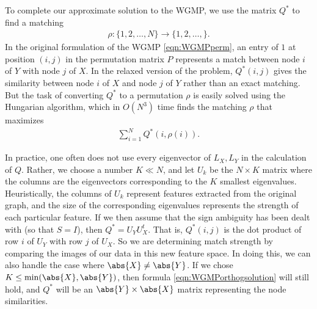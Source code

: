 \documentclass{article}[11pt]
\begin{document}
To complete our approximate solution to the WGMP, we use the matrix $Q^*$ to
find a matching
\begin{align}
  \rho: \{1,2,\ldots,N\} \to \{1,2,\ldots,\}.
\end{align}
In the original formulation of the WGMP \ref{eqn:WGMPperm}, an entry of $1$ at
position $(i,j)$ in the permutation matrix $P$ represents a match between node
$i$ of $Y$ with node $j$ of $X$. In the relaxed version of the problem,
$Q^*(i,j)$ gives the similarity between node $i$ of $X$ and node $j$ of $Y$
rather than an exact matching. But the task of converting $Q^*$ to a permutation
$\rho$ is easily solved using the Hungarian algorithm, which in $O(N^3)$ time finds
the matching $\rho$ that maximizes
\begin{align}
  \sum_{i=1}^N Q^*(i,\rho(i)).
\end{align}

In practice, one often does not use every eigenvector of $L_X,L_Y$ in the
calculation of $Q$. Rather, we choose a number $K \ll N$, and let $U_k$ be the
$N\times K$ matrix where the columns are the eigenvectors corresponding to the
$K$ smallest eigenvalues. Heuristically, the columns of $U_k$ represent features
extracted from the original graph, and the size of the corresponding eigenvalues
represents the strength of each particular feature. If we then assume that the
sign ambiguity has been dealt with (so that $S = I$), then $Q^* = U_YU_X^t$.
That is, $Q^*(i,j)$ is the dot product of row $i$ of $U_Y$ with row $j$ of
$U_X$. So we are determining match strength by comparing the images of our data
in this new feature space. In doing this, we can also handle the case where
$\abs{X}\neq\abs{Y}$. If we chose $K \leq \min(\abs{X},\abs{Y})$, then formula
\ref{eqn:WGMPorthogsolution} will still hold, and $Q^{*}$ will be an
$\abs{Y} \times \abs{X}$ matrix representing the node similarities.



\end{document}
